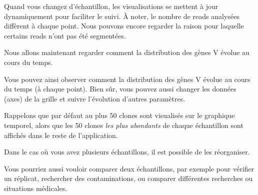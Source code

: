 \documentclass[10pt]{article}
\begin{document}
Quand vous changez d'échantillon, les visualisations se mettent à jour
dynamiquement pour faciliter le suivi. À noter, le nombre de reads
analysées diffèrent à chaque point. Nous pouvons encore
regarder la raison pour laquelle certains reads n'ont pas été segmentées.

\bigskip

Nous allons maintenant regarder comment la distribution des gènes V évolue
au cours du temps.


Vous pouvez ainsi observer comment la distribution des gènes V
évolue au cours du temps (à chaque point). Bien sûr, vous pouvez aussi
changer les données (axes) de la grille et suivre l'évolution
d'autres paramètres.

\bigskip

Rappelons que par défaut au plus 50 clones sont visualisés sur le graphique
temporel, alors que les 50 clones \textit{les plus abondants} de chaque échantillon
sont affichés dans le reste de l'application.


\bigskip

Dans le cas où vous avez plusieurs échantillons, il est possible de les
réorganiser.


\bigskip

Vous pourriez aussi vouloir comparer deux échantillons, par exemple pour vérifier
un réplicat, rechercher des contaminations, ou comparer
différentes recherches ou situations médicales.

\end{document}
